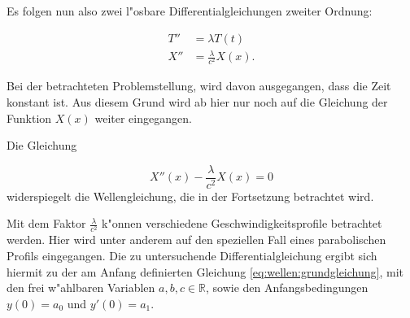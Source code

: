 Es folgen nun also zwei l"osbare Differentialgleichungen zweiter Ordnung:

\begin{align*}
	T'' &= \lambda T(t) \\
	X'' &= \frac{\lambda}{c^2}X(x).
\end{align*}

Bei der betrachteten Problemstellung, wird davon ausgegangen, dass die 
Zeit konstant ist. Aus diesem Grund wird ab hier nur noch auf die Gleichung 
der Funktion $X(x)$ weiter eingegangen.

Die Gleichung

\begin{equation*}
	X''(x) - \frac{\lambda}{c^2} X(x) = 0
\end{equation*}
widerspiegelt die Wellengleichung, die in der Fortsetzung betrachtet wird.

Mit dem Faktor $\frac{\lambda}{c^2}$ k"onnen verschiedene 
Geschwindigkeitsprofile betrachtet werden. Hier wird unter anderem auf den 
speziellen Fall eines parabolischen Profils eingegangen. Die zu untersuchende 
Differentialgleichung ergibt sich hiermit zu der am Anfang definierten 
Gleichung \ref{eq:wellen:grundgleichung}, mit den frei w"ahlbaren Variablen 
${a,b,c} \in \mathbb{R}$, sowie den Anfangsbedingungen $y(0) = a_0$ und $y'(0) 
= a_1$.
